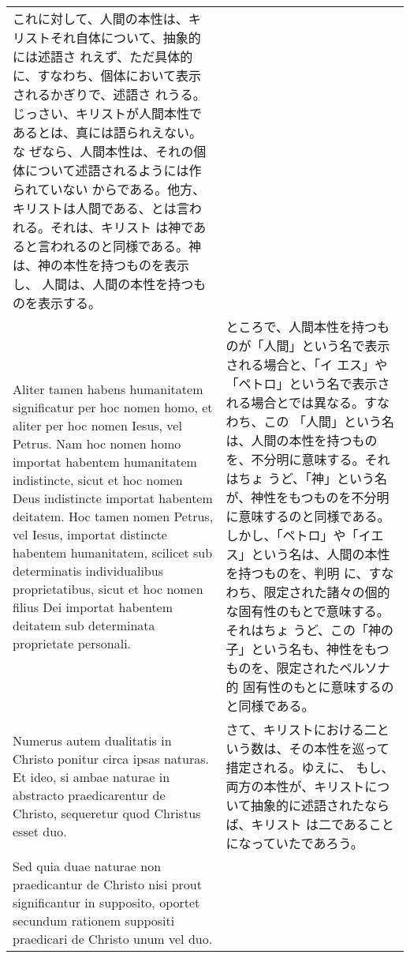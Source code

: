 \documentclass[10pt]{jsarticle} %
\begin{document}
\begin{longtable}{p{21em}p{21em}}
これに対して、人間の本性は、キリストそれ自体について、抽象的には述語さ
れえず、ただ具体的に、すなわち、個体において表示されるかぎりで、述語さ
れうる。じっさい、キリストが人間本性であるとは、真には語られえない。な
ぜなら、人間本性は、それの個体について述語されるようには作られていない
からである。他方、キリストは人間である、とは言われる。それは、キリスト
は神であると言われるのと同様である。神は、神の本性を持つものを表示し、
人間は、人間の本性を持つものを表示する。


\\

Aliter tamen habens
 humanitatem significatur per hoc nomen homo, et aliter per hoc nomen
 Iesus, vel Petrus. Nam hoc nomen homo importat habentem humanitatem
 indistincte, sicut et hoc nomen Deus indistincte importat habentem
 deitatem. Hoc tamen nomen Petrus, vel Iesus, importat distincte
 habentem humanitatem, scilicet sub determinatis individualibus
 proprietatibus, sicut et hoc nomen filius Dei importat habentem
 deitatem sub determinata proprietate personali. 

&

ところで、人間本性を持つものが「人間」という名で表示される場合と、「イ
エス」や「ペトロ」という名で表示される場合とでは異なる。すなわち、この
「人間」という名は、人間の本性を持つものを、不分明に意味する。それはちょ
うど、「神」という名が、神性をもつものを不分明に意味するのと同様である。
しかし、「ペトロ」や「イエス」という名は、人間の本性を持つものを、判明
に、すなわち、限定された諸々の個的な固有性のもとで意味する。それはちょ
うど、この「神の子」という名も、神性をもつものを、限定されたペルソナ的
固有性のもとに意味するのと同様である。



\\


Numerus autem
 dualitatis in Christo ponitur circa ipsas naturas. Et ideo, si ambae
 naturae in abstracto praedicarentur de Christo, sequeretur quod
 Christus esset duo. 

&


さて、キリストにおける二という数は、その本性を巡って措定される。ゆえに、
もし、両方の本性が、キリストについて抽象的に述語されたならば、キリスト
は二であることになっていたであろう。

\\

Sed quia duae naturae non praedicantur de Christo
 nisi prout significantur in supposito, oportet secundum rationem
 suppositi praedicari de Christo unum vel duo. 


\end{longtable}
\end{document}
